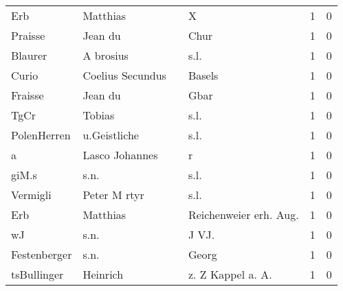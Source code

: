 \begin{tabular}{llllrr}
                      Erb &                           Matthias &             &                                           X &          1 &         0 \\
                  Praisse &                            Jean du &             &                                        Chur &          1 &         0 \\
                  Blaurer &                          A brosius &             &                                        s.l. &          1 &         0 \\
                    Curio &                   Coelius Secundus &             &                                      Basels &          1 &         0 \\
                  Fraisse &                            Jean du &             &                                        Gbar &          1 &         0 \\
                     TgCr &                             Tobias &             &                                        s.l. &          1 &         0 \\
              PolenHerren &                       u.Geistliche &             &                                        s.l. &          1 &         0 \\
                        a &                     Lasco Johannes &             &                                           r &          1 &         0 \\
                    giM.s &                               s.n. &             &                                        s.l. &          1 &         0 \\
                 Vermigli &                       Peter M rtyr &             &                                        s.l. &          1 &         0 \\
                      Erb &                           Matthias &             &                     Reichenweier erh. Aug.  &          1 &         0 \\
                       wJ &                               s.n. &             &                                      J VJ.  &          1 &         0 \\
             Festenberger &                               s.n. &             &                                       Georg &          1 &         0 \\
              tsBullinger &                           Heinrich &             &                          z. Z Kappel a. A.  &          1 &         0 \\

\end{tabular}
